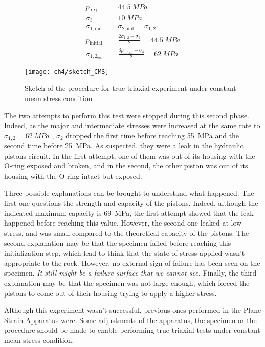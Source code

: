 \begin{align}
    p_{TT1} &= \SI{44.5}{MPa}\\
    \sigma_3 &= \SI{10}{MPa}\\
    \sigma_{1,\text{init}} &= \sigma_{2,\text{init}} = \sigma_{1,2} \\
    p_\text{initial} &= \frac{2\sigma_{1,2}-\sigma_3}{2} = \SI{44.5}{MPa}\\
    \sigma_{1,2_{\text{int}}} &= \frac{3p_\text{initial}-\sigma_3}{2} = \SI{62}{MPa}
\end{align}

\begin{figure}[tb]
    \centering
    \texttt{[image: ch4/sketch\_CMS]}
    \caption{Sketch of the procedure for true-triaxial experiment under constant mean stress condition}
    \label{fig4:16}
\end{figure} 

The two attempts to perform this test were stopped during this second phase. Indeed, as the major and intermediate stresses were increased at the same rate to $\sigma_{1,2} = \SI{62}{MPa}$ , $\sigma_2$ dropped the first time before reaching \SI{55}{MPa} and the second time before \SI{25}{MPa}. As suspected, they were a leak in the hydraulic pistons circuit. In the first attempt, one of them was out of its housing with the O-ring exposed and broken, and in the second, the other piston was out of its housing with the O-ring intact but exposed. 

Three possible explanations can be brought to understand what happened. The first one questions the strength and capacity of the pistons. Indeed, although the indicated maximum capacity is \SI{69}{MPa}, the first attempt showed that the leak happened before reaching this value. However, the second one leaked at low stress, and was small compared to the theoretical capacity of the pistons. The second explanation may be that the specimen failed before reaching this initialization step, which lead to think that the state of stress applied wasn’t appropriate to the rock. However, no external sign of failure has been seen on the specimen. \emph{It still might be a failure surface that we cannot see.} Finally, the third explanation may be that the specimen was not large enough, which forced the pistons to come out of their housing trying to apply a higher stress.

Although this experiment wasn't successful, previous ones performed in the Plane Strain Apparatus were. Some adjustments of the apparatus, the specimen or the procedure should be made to enable performing true-triaxial tests under constant mean stress condition. 